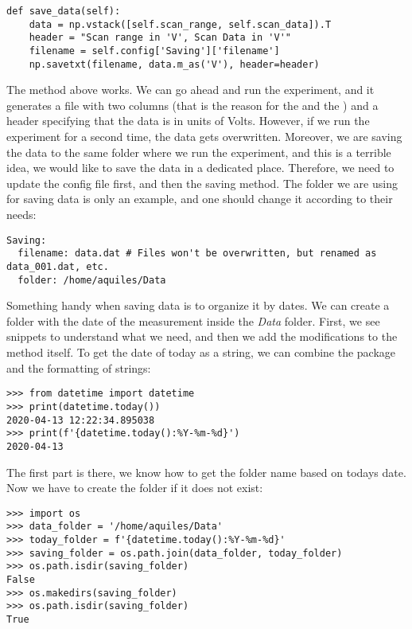 \begin{verbatim}
def save_data(self):
    data = np.vstack([self.scan_range, self.scan_data]).T
    header = "Scan range in 'V', Scan Data in 'V'"
    filename = self.config['Saving']['filename']
    np.savetxt(filename, data.m_as('V'), header=header)
\end{verbatim}

The method above works. We can go ahead and run the experiment, and it generates a file with two columns (that is the reason for the  and the ) and a header specifying that the data is in units of Volts. However, if we run the experiment for a second time, the data gets overwritten. Moreover, we are saving the data to the same folder where we run the experiment, and this is a terrible idea, we would like to save the data in a dedicated place. Therefore, we need to update the config file first, and then the saving method. The folder we are using for saving data is only an example, and one should change it according to their needs:

\begin{verbatim}
Saving:
  filename: data.dat # Files won't be overwritten, but renamed as data_001.dat, etc.
  folder: /home/aquiles/Data
\end{verbatim}

Something handy when saving data is to organize it by dates. We can create a folder with the date of the measurement inside the \emph{Data} folder. First, we see snippets to understand what we need, and then we add the modifications to the method itself. To get the date of today as a string, we can combine the  package and the formatting of strings:

\begin{verbatim}
>>> from datetime import datetime
>>> print(datetime.today())
2020-04-13 12:22:34.895038
>>> print(f'{datetime.today():%Y-%m-%d}')
2020-04-13
\end{verbatim}

The first part is there, we know how to get the folder name based on todays date. Now we have to create the folder if it does not exist:

\begin{verbatim}
>>> import os
>>> data_folder = '/home/aquiles/Data'
>>> today_folder = f'{datetime.today():%Y-%m-%d}'
>>> saving_folder = os.path.join(data_folder, today_folder)
>>> os.path.isdir(saving_folder)
False
>>> os.makedirs(saving_folder)
>>> os.path.isdir(saving_folder)
True
\end{verbatim}

